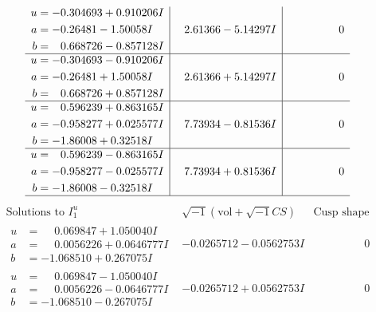 \documentclass[1p]{elsarticle_modified}
\theoremstyle{definition}
\newcommand{\I}{\sqrt{-1}}
\begin{document}
$$\begin{array}{c|c|c}
\begin{aligned}
u &= -0.304693 + 0.910206 I \\
a &= -0.26481 - 1.50058 I \\
b &= \phantom{-}0.668726 - 0.857128 I\end{aligned}
 & \phantom{-}2.61366 - 5.14297 I & \phantom{-0.000000 } 0 \\ \hline\begin{aligned}
u &= -0.304693 - 0.910206 I \\
a &= -0.26481 + 1.50058 I \\
b &= \phantom{-}0.668726 + 0.857128 I\end{aligned}
 & \phantom{-}2.61366 + 5.14297 I & \phantom{-0.000000 } 0 \\ \hline\begin{aligned}
u &= \phantom{-}0.596239 + 0.863165 I \\
a &= -0.958277 + 0.025577 I \\
b &= -1.86008 + 0.32518 I\end{aligned}
 & \phantom{-}7.73934 - 0.81536 I & \phantom{-0.000000 } 0 \\ \hline\begin{aligned}
u &= \phantom{-}0.596239 - 0.863165 I \\
a &= -0.958277 - 0.025577 I \\
b &= -1.86008 - 0.32518 I\end{aligned}
 & \phantom{-}7.73934 + 0.81536 I & \phantom{-0.000000 } 0\\
 \hline 
 \end{array}$$\newpage$$\begin{array}{c|c|c}  
\text{Solutions to }I^u_{1}& \I (\text{vol} + \sqrt{-1}CS) & \text{Cusp shape}\\
 \hline 
\begin{aligned}
u &= \phantom{-}0.069847 + 1.050040 I \\
a &= \phantom{-}0.0056226 + 0.0646777 I \\
b &= -1.068510 + 0.267075 I\end{aligned}
 & -0.0265712 - 0.0562753 I & \phantom{-0.000000 } 0 \\ \hline\begin{aligned}
u &= \phantom{-}0.069847 - 1.050040 I \\
a &= \phantom{-}0.0056226 - 0.0646777 I \\
b &= -1.068510 - 0.267075 I\end{aligned}
 & -0.0265712 + 0.0562753 I & \phantom{-0.000000 } 0 \\ \hline\begin{aligned}

\end{aligned}
\end{array}$$
\end{document}
